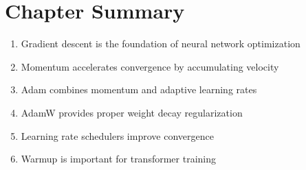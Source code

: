 \section{Chapter Summary}

\begin{enumerate}
    \item Gradient descent is the foundation of neural network optimization
    \item Momentum accelerates convergence by accumulating velocity
    \item Adam combines momentum and adaptive learning rates
    \item AdamW provides proper weight decay regularization
    \item Learning rate schedulers improve convergence
    \item Warmup is important for transformer training
\end{enumerate}
